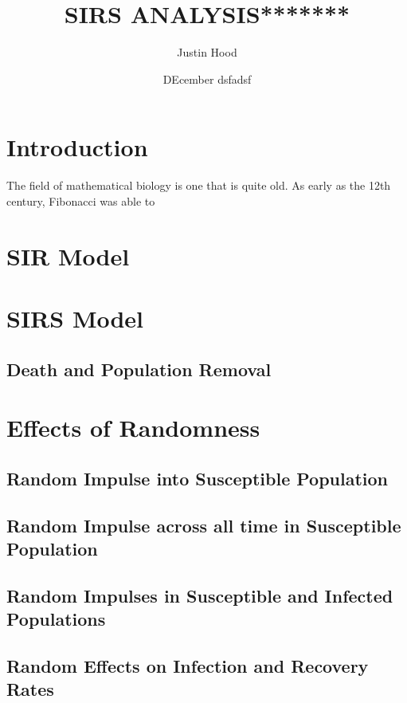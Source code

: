 \documentclass[letterpaper,12pt]{article}
\title{\textbf{SIRS ANALYSIS*******}}
\author{Justin Hood}
\date{DEcember dsfadsf}
\begin{document}
\maketitle
\newpage
\tableofcontents
\newpage

\section{Introduction}
The field of mathematical biology is one that is quite old. As early as the 12th century, Fibonacci was able to 

\section{SIR Model}

\section{SIRS Model}
\subsection{Death and Population Removal}

\section{Effects of Randomness}
\subsection{Random Impulse into Susceptible Population}
\subsection{Random Impulse across all time in Susceptible Population}
\subsection{Random Impulses in Susceptible and Infected Populations}
\subsection{Random Effects on Infection and Recovery Rates}
\end{document}
